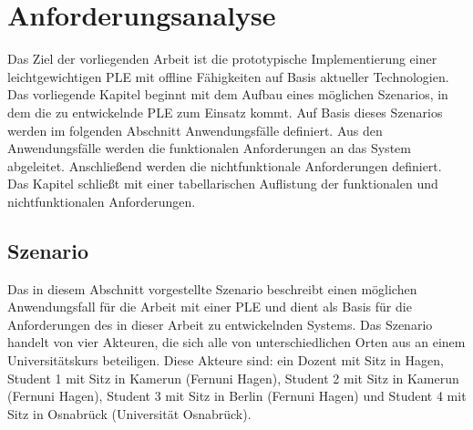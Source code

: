 \newcommand{\requirementOfflineWork}{Das System muss den Anwender in die Lage versetzen mit den gewählten Services, zumindest rudimentär, offline zu arbeiten.}
\newcommand{\requirementOnlineSync}{Bei einer Verbindung mit dem Internet müssen die offline vorgenommenen Arbeiten mit den Services synchronisiert werden.}
\newcommand{\requirementAggregator}{Das System muss als Aggregator für unterschiedliche externe Kanäle und Services dienen und dem Anwender die Arbeit mit ihnen an zentraler Stelle ermöglichen.}
\newcommand{\requirementWidgetStandard}{Die Services müssen über einen frei verfügbaren Standard in das System eingebunden werden können.}
\newcommand{\requirementUsbStick}{Die durchgeführten Arbeiten müssen offline zwischen unterschiedlichen Rechnern transportiert werden können.}
\newcommand{\requirementUsageInBrowser}{Das System muss in aktuellen Browsern mit nativen Browsertechnologien ohne weitere Installation nutzbar sein.}
\newcommand{\requirementExtensibility}{Das System muss einfach erweitert werden können.}
\newcommand{\requirementNewWidgetsWithApi}{Es muss möglich sein über eine \ac{API} oder eine vorgegebene Implementierung neue Services und Kanäle mit offline Fähigkeiten in das System zu laden.}
\newcommand{\requirementExampleWidget}{Es muss ein offline fähiges Widget entwickelt werden, welches die offline Funktionalitäten beispielhaft umsetzt.}
\newcommand{\requirementOpenSource}{Es dürfen keine proprietären, sondern nur freie Technologien für die Umsetzung des Systems genutzt werden.}

\chapter{Anforderungsanalyse}\label{chapter:Kapitel3}  

Das Ziel der vorliegenden Arbeit ist die prototypische Implementierung einer leichtgewichtigen \ac{PLE} mit offline Fähigkeiten auf Basis aktueller Technologien. Das vorliegende Kapitel beginnt mit dem Aufbau eines möglichen Szenarios, in dem die zu entwickelnde \ac{PLE} zum Einsatz kommt. Auf Basis dieses Szenarios werden im folgenden Abschnitt Anwendungsfälle definiert. Aus den Anwendungsfälle werden die funktionalen Anforderungen an das System abgeleitet. Anschließend werden die nichtfunktionale Anforderungen definiert. Das Kapitel schließt mit einer tabellarischen Auflistung der funktionalen und nichtfunktionalen Anforderungen. 

\section{Szenario}\label{section:szenario}
Das in diesem Abschnitt vorgestellte Szenario beschreibt einen möglichen Anwendungsfall für die Arbeit mit einer \ac{PLE} und dient als Basis für die Anforderungen des in dieser Arbeit zu entwickelnden Systems. Das Szenario handelt von vier Akteuren, die sich alle von unterschiedlichen Orten aus an einem Universitätskurs beteiligen. Diese Akteure sind: ein Dozent mit Sitz in Hagen, Student 1 mit Sitz in Kamerun (Fernuni Hagen), Student 2 mit Sitz in Kamerun (Fernuni Hagen), Student 3 mit Sitz in Berlin (Fernuni Hagen) und Student 4 mit Sitz in Osnabrück (Universität Osnabrück).


